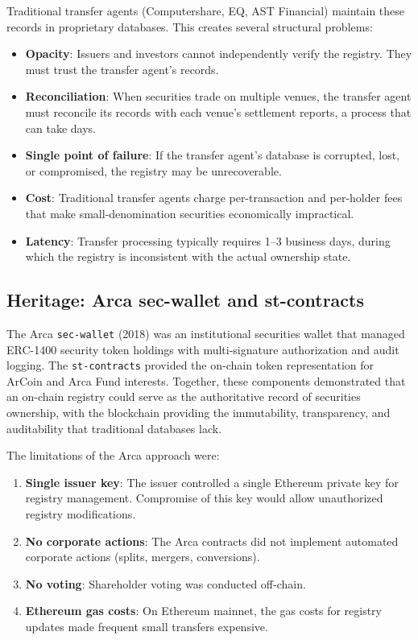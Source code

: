 \documentclass[11pt,a4paper]{article}
\begin{document}
Traditional transfer agents (Computershare, EQ, AST Financial) maintain these records in proprietary databases. This creates several structural problems:

\begin{itemize}[nosep]
  \item \textbf{Opacity}: Issuers and investors cannot independently verify the registry. They must trust the transfer agent's records.
  \item \textbf{Reconciliation}: When securities trade on multiple venues, the transfer agent must reconcile its records with each venue's settlement reports, a process that can take days.
  \item \textbf{Single point of failure}: If the transfer agent's database is corrupted, lost, or compromised, the registry may be unrecoverable.
  \item \textbf{Cost}: Traditional transfer agents charge per-transaction and per-holder fees that make small-denomination securities economically impractical.
  \item \textbf{Latency}: Transfer processing typically requires 1--3 business days, during which the registry is inconsistent with the actual ownership state.
\end{itemize}

\subsection{Heritage: Arca sec-wallet and st-contracts}

The Arca \texttt{sec-wallet} (2018) was an institutional securities wallet that managed ERC-1400 security token holdings with multi-signature authorization and audit logging. The \texttt{st-contracts} provided the on-chain token representation for ArCoin and Arca Fund interests. Together, these components demonstrated that an on-chain registry could serve as the authoritative record of securities ownership, with the blockchain providing the immutability, transparency, and auditability that traditional databases lack.

The limitations of the Arca approach were:

\begin{enumerate}[nosep]
  \item \textbf{Single issuer key}: The issuer controlled a single Ethereum private key for registry management. Compromise of this key would allow unauthorized registry modifications.
  \item \textbf{No corporate actions}: The Arca contracts did not implement automated corporate actions (splits, mergers, conversions).
  \item \textbf{No voting}: Shareholder voting was conducted off-chain.
  \item \textbf{Ethereum gas costs}: On Ethereum mainnet, the gas costs for registry updates made frequent small transfers expensive.
\end{enumerate}
\end{document}
